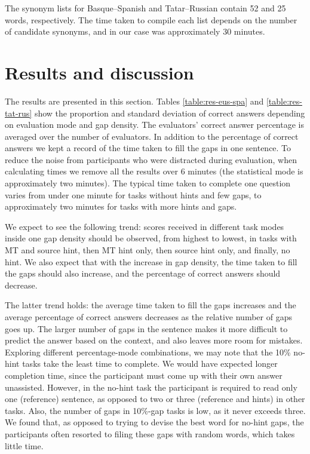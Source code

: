 \documentclass[11pt]{article}
\newcommand{\comment}[1]{}
\begin{document}
The synonym lists for Basque--Spanish and Tatar--Russian contain 52 and 25 words, respectively. The time taken to compile each list depends on the number of candidate synonyms, and in our case was approximately 30 minutes. 

\section{Results and discussion}
\label{sec:results}

The results are presented in this section. Tables \ref{table:res-eus-spa} and \ref{table:res-tat-rus} 
show
the proportion and standard deviation of correct answers depending on evaluation mode and gap density.
The evaluators' correct answer percentage is averaged over the number of evaluators. In addition to the percentage of correct answers we kept a record of the time taken to fill the gaps in one sentence. To reduce the noise from participants who were distracted during evaluation, when
calculating times we remove all the results over 6 minutes (the statistical mode is approximately
two minutes). The typical time taken to complete one question varies from under one minute for tasks without hints and few gaps, to approximately two minutes for tasks with more hints and gaps. 

We expect to see the following trend: scores received in different task modes inside one gap density should be observed, from highest to lowest, in tasks with MT and source hint, then MT hint only, then source hint only, and finally, no hint. We also expect that with the increase in gap density, the time taken to fill the gaps should also increase, and the percentage of correct answers should decrease. 

The latter trend holds: the average time taken to fill the gaps increases and the average percentage of correct answers decreases as the relative number of gaps goes up. The larger number of gaps in the sentence makes it more
difficult to predict the answer based on the context, and also leaves more room for
mistakes. Exploring different percentage-mode combinations, we may note that the 10\% no-hint tasks take the least time to complete. We would have expected longer completion time, since the participant must come up with their own answer unassisted. However, in the no-hint task the participant is required to read only one (reference) sentence, as opposed to two or three (reference and hints) in other tasks. Also, the number of gaps in 10\%-gap tasks is low, as it never exceeds three. We found that, as opposed to trying to devise the best word for no-hint gaps, the participants often resorted to filing these gaps with random words, which takes little time.
\end{document}

